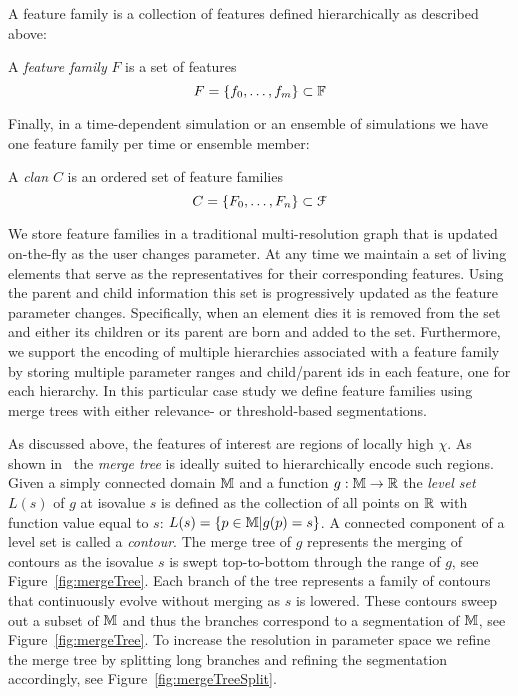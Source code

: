 A feature family is a collection of features defined hierarchically as described above:

\begin{definition}
  A \emph{feature family} $F$ is a set of features 
  $$F = \{f_0,\ldots,f_m\} \subset \mathbb{F}$$
\end{definition}

\noindent
Finally, in a time-dependent simulation or an ensemble of simulations we have
one feature family per time or ensemble member:

\begin{definition}[Clan]
  A \emph{clan} $C$ is an ordered set of feature families
  $$C = \{F_0,\ldots, F_n\} \subset \mathcal{F}$$
\end{definition}

\noindent
We store feature families in a traditional multi-resolution graph that is
updated on-the-fly as the user changes parameter. At any time we maintain a set
of living elements that serve as the representatives for their corresponding
features. Using the parent and child information this set is progressively
updated as the feature parameter changes. Specifically, when an element dies it is
removed from the set and either its children or its parent are born and added
to the set. Furthermore, we support the encoding of multiple hierarchies
associated with a feature family by storing multiple
parameter ranges and child/parent ids in each feature, one for each
hierarchy. In this particular case study we define feature families using merge trees 
with either relevance- or threshold-based segmentations.

As discussed above, the features of interest are regions of locally high
$\chi$. As shown in~\cite{Mascarenhas09,Bremer10tvcg} the {\it merge tree} is
ideally suited to hierarchically encode such regions.  Given a simply connected
domain $\mathbb{M}$ and a function $g:\mathbb{M} \rightarrow \mathbb{R}$ the {\it level
  set} $L(s)$ of $g$ at isovalue $s$ is defined as the collection of all points
on $\mathbb{R}$ with function value equal to $s$: $L(s) = \{p \in \mathbb{M} | g(p) =
s\}$. A connected component of a level set is called a {\it contour}. The merge
tree of $g$ represents the merging of contours as the isovalue $s$ is swept
top-to-bottom through the range of $g$, see Figure~\ref{fig:mergeTree}.  Each
branch of the tree represents a family of contours that continuously evolve
without merging as $s$ is lowered. These contours sweep out a subset of
$\mathbb{M}$ and thus the branches correspond to a segmentation of $\mathbb{M}$, see
Figure~\ref{fig:mergeTree}. To increase the resolution in parameter space we
refine the merge tree by splitting long branches and refining the segmentation
accordingly, see Figure~\ref{fig:mergeTreeSplit}.

